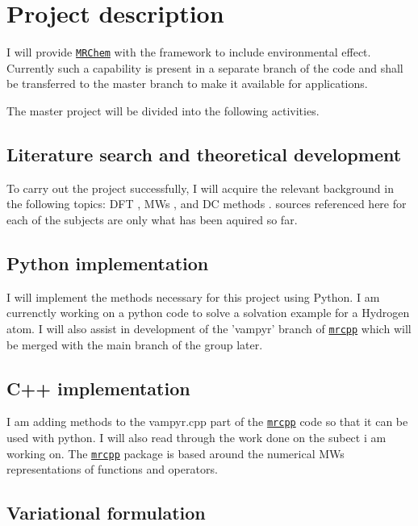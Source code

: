 \documentclass[a4paper,11pt]{article}
\newcommand{\mrchem}{\href{https://mrchem.readthedocs.io/en/latest/}{\texttt{MRChem}}}
\newcommand{\mrcpp}{\href{https://mrcpp.readthedocs.io/en/latest/}{\texttt{mrcpp}}}
\begin{document}
\section{Project description}

I will provide \mrchem{} with the
framework to include environmental effect. Currently such a capability
is present in a separate branch of the code and shall be transferred
to the master branch to make it available for applications.

The master project will be divided into the following activities.

\subsection{Literature search and theoretical development}

To carry out the project successfully, I will acquire the relevant
background in the following topics: \acl{DFT} \cite{Jensen:2017}, \aclp{MW}
\cite{Frediani:2013, FossoTande:2013ka, Beylkin1999AdaptiveSO} ,
and \acl{DC} methods \cite{FossoTande:2013ka, Lipparini:2010bg}.
sources referenced here for each of the subjects are only what has been aquired so far.

\subsection{Python implementation}

I will implement the methods necessary for this project using Python.
I am currenctly working on a python code to solve a solvation example
for a Hydrogen atom. I will also assist in development of the 'vampyr'
branch of \mrcpp{} which will be merged with the main branch of the group
later.

\subsection{C++ implementation}
I am adding methods to the vampyr.cpp part of the \mrcpp{} code so
that it can be used with python. I will also read through the work
done on the subect i am working on. The \mrcpp{} package is based
around the numerical \aclp{MW} representations of functions and
operators.

\subsection{Variational formulation}
\end{document}
